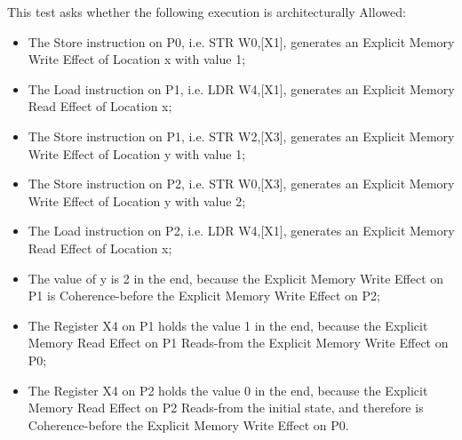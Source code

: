 This test asks whether the following execution is architecturally Allowed:

\begin{itemize}
  \item The Store instruction on P0, i.e. STR W0,[X1], generates an Explicit Memory Write Effect of Location x with value 1;
  \item The Load instruction on P1, i.e. LDR W4,[X1], generates an Explicit Memory Read Effect of Location x;
  \item The Store instruction on P1, i.e. STR W2,[X3], generates an Explicit Memory Write Effect of Location y with value 1;
  \item The Store instruction on P2, i.e. STR W0,[X3], generates an Explicit Memory Write Effect of Location y with value 2;
  \item The Load instruction on P2, i.e. LDR W4,[X1], generates an Explicit Memory Read Effect of Location x;
  \item The value of y is 2 in the end, because the Explicit Memory Write Effect on P1 is Coherence-before the Explicit Memory Write Effect on P2;
  \item The Register X4 on P1 holds the value 1 in the end, because the Explicit Memory Read Effect on P1 Reads-from the Explicit Memory Write Effect on P0;
  \item The Register X4 on P2 holds the value 0 in the end, because the Explicit Memory Read Effect on P2 Reads-from the initial state, and therefore is Coherence-before the Explicit Memory Write Effect on P0.
\end{itemize}
